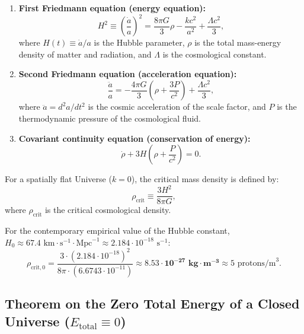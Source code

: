\begin{enumerate}
\item \textbf{First Friedmann equation (energy equation):}
\begin{equation}\label{eq:3.2}\tag{3.2}
H^2 \equiv \left( \frac{\dot{a}}{a} \right)^2 = \frac{8\pi G}{3} \rho - \frac{k c^2}{a^2} + \frac{\Lambda c^2}{3},
\end{equation}
where $H(t) \equiv \dot{a}/a$ is the Hubble parameter, $\rho$ is the total mass-energy density of matter and radiation, and $\Lambda$ is the cosmological constant.

\item \textbf{Second Friedmann equation (acceleration equation):}
\begin{equation}\label{eq:3.3}\tag{3.3}
\frac{\ddot{a}}{a} = -\frac{4\pi G}{3} \left( \rho + \frac{3P}{c^2} \right) + \frac{\Lambda c^2}{3},
\end{equation}
where $\ddot{a} = d^2 a / dt^2$ is the cosmic acceleration of the scale factor, and $P$ is the thermodynamic pressure of the cosmological fluid.

\item \textbf{Covariant continuity equation (conservation of energy):}
\begin{equation}\label{eq:3.4}\tag{3.4}
\dot{\rho} + 3 H \left( \rho + \frac{P}{c^2} \right) = 0.
\end{equation}
\end{enumerate}

For a spatially flat Universe ($k = 0$), the critical mass density is defined by:
\begin{equation}\label{eq:3.5}\tag{3.5}
\rho_{\text{crit}} \equiv \frac{3 H^2}{8\pi G},
\end{equation}
where $\rho_{\text{crit}}$ is the critical cosmological density.

For the contemporary empirical value of the Hubble constant, $H_0 \approx 67.4\text{ km}\cdot\text{s}^{-1}\cdot\text{Mpc}^{-1} \approx 2.184 \cdot 10^{-18}\text{ s}^{-1}$:
\begin{equation}\label{eq:3.6}\tag{3.6}
\rho_{\text{crit}, 0} = \frac{3 \cdot (2.184 \cdot 10^{-18})^2}{8\pi \cdot (6.6743 \cdot 10^{-11})} \approx \mathbf{8.53 \cdot 10^{-27}\text{ kg}\cdot\text{m}^{-3}} \approx 5\text{ protons/m}^3.
\end{equation}

\subsection{Theorem on the Zero Total Energy of a Closed Universe ($E_{\text{total}} \equiv 0$)}\label{sec:3.2}

